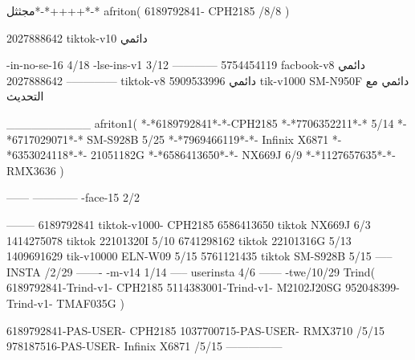 مجثثل*-*++++*-*
afriton(
6189792841- CPH2185  /8/8
)

2027888642 tiktok-v10
دائمي

-in-no-se-16 4/18
-lse-ins-v1 3/12
------------
5754454119 facbook-v8
دائمي
--------------
2027888642 tiktok-v8
دائمي
5909533996 tik-v1000  SM-N950F
دائمي مع التحديث

__________
afriton1(
*-*6189792841*-*-CPH2185
*-*7706352211*-* 5/14
*-*6717029071*-*  SM-S928B 5/25
*-*7969466119*-*- Infinix X6871 \5
*-*6353024118*-*- 21051182G \5
*-*6586413650*-*- NX669J  6/9
*-*1127657635*-*- RMX3636 \5
)


------
------------
-face-15 2/2

--------
6189792841 tiktok-v1000- CPH2185 
6586413650 tiktok NX669J  6/3
1414275078 tiktok 22101320I  5/10
6741298162 tiktok 22101316G  5/13
1409691629 tik-v10000 ELN-W09  5/15
5761121435 tiktok SM-S928B   5/15
-----
 INSTA /2/29
-------
-m-v14 1/14
-----
userinsta 4/6
------
-twe/10/29
Trind(
6189792841-Trind-v1- CPH2185 
5114383001-Trind-v1- M2102J20SG \5
952048399-Trind-v1- TMAF035G \5
)

6189792841-PAS-USER- CPH2185 
1037700715-PAS-USER- RMX3710  /5/15
978187516-PAS-USER- Infinix X6871  /5/15
    ---------------
